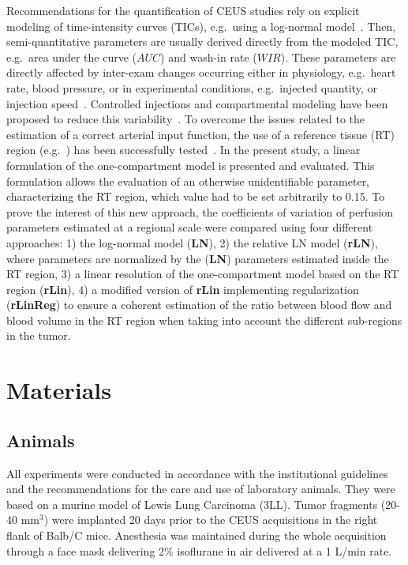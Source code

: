 Recommendations for the quantification of CEUS studies rely on explicit modeling of time-intensity curves (TICs), e.g.~using a log-normal model~\cite{Dietrich:2012kw}. 
Then, semi-quantitative parameters are usually derived directly from the modeled TIC, e.g.~area under the curve ($AUC$) and wash-in rate ($WIR$). 
These parameters are directly affected by inter-exam changes occurring either in physiology, e.g.~heart rate, blood pressure, or in experimental conditions, e.g.~injected quantity, or injection speed~\cite{Tang:2011fja}.
Controlled injections and compartmental modeling have been proposed to reduce this variability~\cite{Doury:2017fz}. To overcome the issues related to the estimation of a correct arterial input function, the use of a reference tissue (RT) region (e.g.~\cite{CardenasRodriguez:2013em}) has been successfully tested~\cite{Doury:2017fz}. 
In the present study, a linear formulation of the one-compartment model is presented and evaluated. This formulation allows the evaluation of an otherwise unidentifiable parameter, characterizing the RT region, which value had to be set arbitrarily to 0.15. To prove the interest of this new approach, the coefficients of variation of perfusion parameters estimated at a regional scale were compared using four different approaches: 1) the log-normal model (\textbf{LN}), 2) the relative LN model (\textbf{rLN}), where parameters are normalized by the (\textbf{LN}) parameters estimated inside the RT region, 3) a linear resolution of the one-compartment model based on the RT region (\textbf{rLin}), 4) a modified version of \textbf{rLin} implementing  regularization (\textbf{rLinReg}) to ensure a coherent estimation of the ratio between blood flow and blood volume in the RT region when taking into account the different sub-regions in the tumor.


\section{Materials}
\subsection{Animals}
All experiments were conducted in accordance with the institutional guidelines and the recommendations for the care and use of laboratory animals. They were based on a murine model of Lewis Lung Carcinoma (3LL). Tumor fragments (20-40 mm$^3$) were implanted 20 days prior to the CEUS acquisitions in the right flank of Balb/C mice. Anesthesia was maintained during the whole acquisition through a face mask delivering 2\% isoflurane in air delivered at a 1 L/min rate. 

